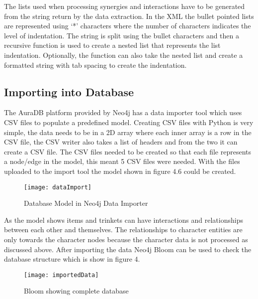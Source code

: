 The lists used when processing synergies and interactions have to be generated from the string return by the data extraction.
In the XML the bullet pointed lists are represented using `*' characters where the number of characters indicates the level of indentation.
The string is split using the bullet characters and then a recursive function is used to create a nested list that represents the list indentation.
Optionally, the function can also take the nested list and create a formatted string with tab spacing to create the indentation.
\subsection{Importing into Database}
The AuraDB platform provided by Neo4j has a data importer tool which uses CSV files to populate a predefined model. 
Creating CSV files with Python is very simple, the data needs to be in a 2D array where each inner array is a row in the CSV file,
the CSV writer also takes a list of headers and from the two it can create a CSV file. The CSV files needed to be created so that each file represents 
a node/edge in the model, this meant 5 CSV files were needed. With the files uploaded to the import tool the model shown in figure 4.6 could be created.
\begin{figure}[H]
    \centering
    \texttt{[image: dataImport]}
    \caption{Database Model in Neo4j Data Importer}
\end{figure}
As the model shows items and trinkets can have interactions and relationships between each other and themselves. The relationships to character 
entities are only towards the character nodes because the character data is not processed as discussed above.
After importing the data Neo4j Bloom can be used to check the database structure which is show in figure 4.
\begin{figure}[H]
    \centering
    \texttt{[image: importedData]}
    \caption{Bloom showing complete database}
\end{figure}
